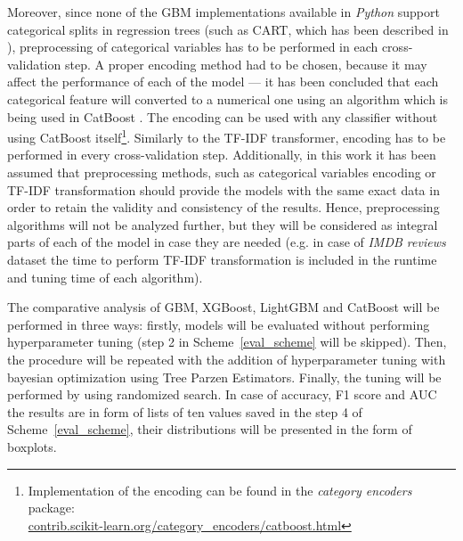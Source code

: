 \documentclass[magisterska, english]{pwr_wmat_praca_dyplomowa}
\theoremstyle{plain}
\numberwithin{theorem}{chapter}
\theoremstyle{definition}
\numberwithin{theorem}{chapter}
\begin{document}
Moreover, since none of the GBM implementations available in \emph{Python} support categorical splits in regression trees (such as CART, which has been described in \cite{esl}), preprocessing of categorical variables has to be performed in each cross-validation step. A proper encoding method had to be chosen, because it may affect the performance of each of the model --- it has been concluded that each categorical feature will converted to a numerical one using an algorithm which is being used in CatBoost \cite{catboost}. The encoding can be used with any classifier without using CatBoost itself\footnote{Implementation of the encoding can be found in the \emph{category encoders} package:\\\indent \url{contrib.scikit-learn.org/category_encoders/catboost.html}}. Similarly to the TF-IDF transformer, encoding has to be performed in every cross-validation step. Additionally, in this work it has been assumed that preprocessing methods, such as categorical variables encoding or TF-IDF transformation should provide the models with the same exact data in order to retain the validity and consistency of the results. Hence, preprocessing algorithms will not be analyzed further, but they will be considered as integral parts of each of the model in case they are needed (e.g. in case of \emph{IMDB reviews} dataset the time to perform TF-IDF transformation is included in the runtime and tuning time of each algorithm).

The comparative analysis of GBM, XGBoost, LightGBM and CatBoost will be performed in three ways: firstly, models will be evaluated without performing hyperparameter tuning (step 2 in Scheme~\ref{eval_scheme} will be skipped). Then, the procedure will be repeated with the addition of hyperparameter tuning with bayesian optimization using Tree Parzen Estimators. Finally, the tuning will be performed by using randomized search. In case of accuracy, F1 score and AUC the results are in form of lists of ten values saved in the step 4 of Scheme~\ref{eval_scheme}, their distributions will be presented in the form of boxplots.
\end{document}
